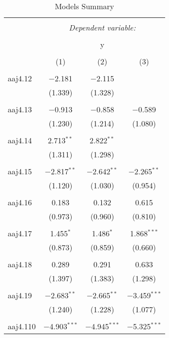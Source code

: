 
\begin{table}[!htbp] \centering 
  \caption{Models Summary} 
  \label{} 
\begin{tabular}{@{\extracolsep{5pt}}lccc} 
\\[-1.8ex]\hline 
\hline \\[-1.8ex] 
 & \multicolumn{3}{c}{\textit{Dependent variable:}} \\ 
\cline{2-4} 
\\[-1.8ex] & \multicolumn{3}{c}{y} \\ 
\\[-1.8ex] & (1) & (2) & (3)\\ 
\hline \\[-1.8ex] 
 aaj4.12 & $-$2.181 & $-$2.115 &  \\ 
  & (1.339) & (1.328) &  \\ 
  & & & \\ 
 aaj4.13 & $-$0.913 & $-$0.858 & $-$0.589 \\ 
  & (1.230) & (1.214) & (1.080) \\ 
  & & & \\ 
 aaj4.14 & 2.713$^{**}$ & 2.822$^{**}$ &  \\ 
  & (1.311) & (1.298) &  \\ 
  & & & \\ 
 aaj4.15 & $-$2.817$^{**}$ & $-$2.642$^{**}$ & $-$2.265$^{**}$ \\ 
  & (1.120) & (1.030) & (0.954) \\ 
  & & & \\ 
 aaj4.16 & 0.183 & 0.132 & 0.615 \\ 
  & (0.973) & (0.960) & (0.810) \\ 
  & & & \\ 
 aaj4.17 & 1.455$^{*}$ & 1.486$^{*}$ & 1.868$^{***}$ \\ 
  & (0.873) & (0.859) & (0.660) \\ 
  & & & \\ 
 aaj4.18 & 0.289 & 0.291 & 0.633 \\ 
  & (1.397) & (1.383) & (1.298) \\ 
  & & & \\ 
 aaj4.19 & $-$2.683$^{**}$ & $-$2.665$^{**}$ & $-$3.459$^{***}$ \\ 
  & (1.240) & (1.228) & (1.077) \\ 
  & & & \\ 
 aaj4.110 & $-$4.903$^{***}$ & $-$4.945$^{***}$ & $-$5.325$^{***}$ \\ 

\end{tabular}
\end{table}
